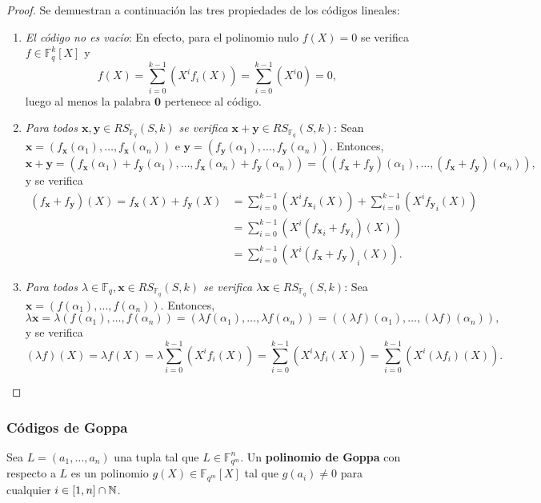 \begin{proof}
	Se demuestran a continuación las tres propiedades de los códigos lineales:
	\begin{enumerate}
		\item \textit{El código no es vacío}: En efecto, para el polinomio nulo $f(X) = 0$ se verifica $f \in \mathbb{F}_q^k[X]$ y 
		\[f(X) = \sum_{i=0}^{k-1}(X^i f_i(X)) = \sum_{i=0}^{k-1}(X^i 0) = 0,\]
		luego al menos la palabra $\textbf{0}$ pertenece al código.
		\item \textit{Para todos $\textbf{x}, \textbf{y} \in RS_{\mathbb{F}_q}(S, k)$ se verifica $\textbf{x} + \textbf{y} \in RS_{\mathbb{F}_q}(S, k)$}: Sean $\textbf{x} = (f_\textbf{x}(\alpha_1), \dots, f_\textbf{x}(\alpha_n))$ e $\textbf{y} = (f_\textbf{y}(\alpha_1), \dots, f_\textbf{y}(\alpha_n))$. Entonces,
		\[\textbf{x} + \textbf{y} = (f_\textbf{x}(\alpha_1) + f_\textbf{y}(\alpha_1), \dots, f_\textbf{x}(\alpha_n) + f_\textbf{y}(\alpha_n)) = ((f_\textbf{x} + f_\textbf{y})(\alpha_1), \dots, (f_\textbf{x} + f_\textbf{y})(\alpha_n)),\]
		y se verifica
		\begin{align*}
			(f_\textbf{x} + f_\textbf{y})(X) = f_\textbf{x}(X) + f_\textbf{y}(X) &= \sum_{i=0}^{k-1}(X^i {f_\textbf{x}}_i(X)) + \sum_{i=0}^{k-1}(X^i {f_\textbf{y}}_i(X))\\
			&= \sum_{i=0}^{k-1}(X^i({f_\textbf{x}}_i + {f_\textbf{y}}_i)(X))\\
			&= \sum_{i=0}^{k-1}(X^i(f_\textbf{x} + f_\textbf{y})_i(X)).
		\end{align*}
		\item \textit{Para todos $\lambda \in \mathbb{F}_q, \textbf{x} \in RS_{\mathbb{F}_q}(S, k)$ se verifica $\lambda\textbf{x} \in RS_{\mathbb{F}_q}(S, k)$}: Sea $\textbf{x} = (f(\alpha_1), \dots, f(\alpha_n))$. Entonces,
		\[\lambda\textbf{x} = \lambda(f(\alpha_1), \dots, f(\alpha_n)) = (\lambda f(\alpha_1), \dots, \lambda f(\alpha_n)) = ((\lambda f)(\alpha_1), \dots, (\lambda f)(\alpha_n)),\]
		y se verifica
		\[(\lambda f)(X) = \lambda f(X) = \lambda \sum_{i=0}^{k-1}(X^i f_i(X)) = \sum_{i=0}^{k-1}(X^i \lambda f_i(X)) = \sum_{i=0}^{k-1}(X^i (\lambda f_i)(X)).\]
	\end{enumerate}
\end{proof}

\subsubsection{Códigos de Goppa}

\begin{definition}
	Sea $L = (a_1, \dots, a_n)$ una tupla tal que $L \in \mathbb{F}_{q^m}^n$. Un \textbf{polinomio de Goppa} con respecto a $L$ es un polinomio $g(X) \in \mathbb{F}_{q^m}[X]$ tal que $g(a_i) \neq 0$ para cualquier $i \in [1, n] \cap \mathbb{N}$.
\end{definition}

